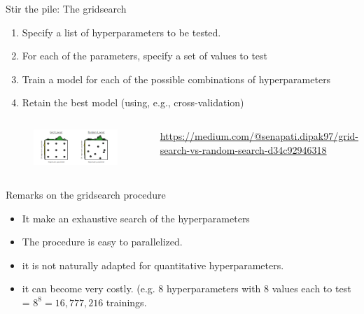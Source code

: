 \documentclass[handout]{beamer}
\begin{document}
\begin{frame}{Stir the pile: The gridsearch}
\begin{enumerate}
    \item Specify a list of hyperparameters to be tested.
    \item For each of the parameters, specify a set of values to test
    \item Train a model for each of the possible combinations of hyperparameters
    \item Retain the best model (using, e.g., cross-validation)
\end{enumerate}

\begin{columns}[b]
\begin{figure}
    \centering
    \includegraphics[trim={0 0 10cm 0},clip,width=\textwidth]{fig/L2/cIDuR.png}
\end{figure}

\vfill
{\footnotesize \url{https://medium.com/@senapati.dipak97/grid-search-vs-random-search-d34c92946318}
}
\end{columns}



\end{frame}

\begin{frame}{Remarks on the gridsearch procedure}

\begin{itemize}[<+->]
    \item It make an \alert{exhaustive} search of the hyperparameters
    \item The procedure is easy to \alert{parallelized}.
    \item it is not naturally adapted for quantitative hyperparameters.
    \item it can become \alert{very costly}. (e.g. 8 hyperparameters with 8 values each to test = $8^8=16,777,216$ trainings.
\end{itemize}

\end{frame}
\end{document}

